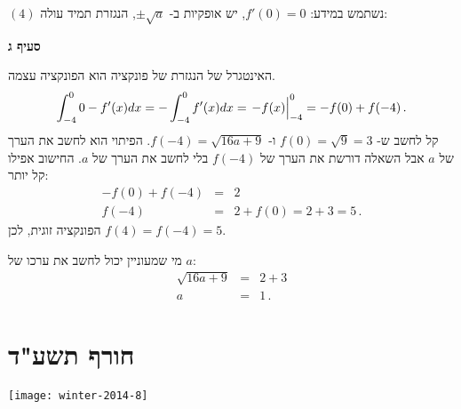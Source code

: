 $(4)$
נשתמש במידע: 
$f'(0)=0$,
יש
\asms{}
אופקיות ב-%
$\pm\sqrt{a}$,
הנגזרת תמיד עולה:
\begin{center}
\end{center}

\textbf{סעיף ג}

האינטגרל של הנגזרת של פונקציה הוא הפונקציה עצמה.
\[
\int_{-4}^{0} 0-f'(x)dx = -\int_{-4}^{0}f'(x)dx = \left.-f(x)\rule{0pt}{12pt}\right|_{-4}^{0} = -f(0) + f(-4)\,.
\]
קל לחשב ש-%
$f(0)=\sqrt{9}=3$
ו-%
$f(-4)=\sqrt{16a+9}$.
הפיתוי הוא לחשב את הערך של 
$a$
אבל השאלה דורשת את הערך של
$f(-4)$
בלי לחשב את הערך של
$a$.
החישוב אפילו קל יותר:
\begin{eqnarray*}
-f(0)+f(-4)&=&2\\
f(-4)&=&2+f(0)=2+3=5\,.
\end{eqnarray*}
הפונקציה זוגית, לכן
$f(4)=f(-4)=5$.

מי שמעוניין יכול לחשב את ערכו של 
$a$:
\begin{eqnarray*}
\sqrt{16a+9}&=&2+3\\
a&=&1\,.
\end{eqnarray*}


\np


\section{חורף תשע"ד}

\begin{center}
\texttt{[image: winter-2014-8]}
\end{center}

\vspace{-4ex}

